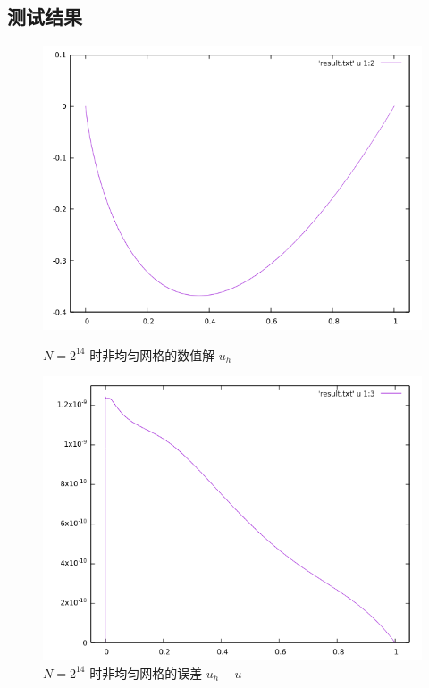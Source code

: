 \documentclass[lang=cn,11pt,a4paper]{elegantpaper}
\begin{document}
\subsection{测试结果}

\begin{figure}[H]
    \centering
    \begin{minipage}[t]{0.48\textwidth}
        \centering
        \includegraphics[width=0.9\linewidth]{png/p1-solution}
        \caption{\small $N=2^{14}$ 时非均匀网格的数值解 $u_h$}
    \end{minipage}
    \hspace{1em}
    \begin{minipage}[t]{0.48\textwidth}
        \centering
        \includegraphics[width=0.9\linewidth]{png/p1-error}
        \caption{\small $N=2^{14}$ 时非均匀网格的误差 $u_h-u$}
    \end{minipage}
\end{figure}
\end{document}
